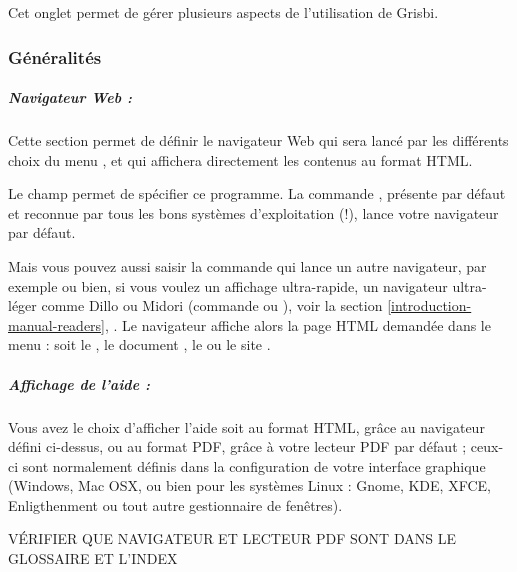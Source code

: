 Cet onglet permet de gérer plusieurs aspects de l'utilisation de Grisbi. 


\subsubsection{Généralités\label{setup-general-various-general}}


\subparagraph{Navigateur Web :\label{setup-general-various-general-browser}}

Cette section permet de définir le navigateur Web qui sera lancé par les différents choix du menu , et qui affichera directement les contenus au format \gls{HTML}. 

Le champ  permet de spécifier ce programme. La commande , présente par défaut et reconnue par tous les bons systèmes d'exploitation (!), lance votre navigateur par défaut.

Mais vous pouvez aussi saisir la commande qui lance un autre navigateur, par exemple  ou bien, si vous voulez un affichage ultra-rapide, un navigateur ultra-léger comme Dillo ou Midori (commande  ou ), voir la section \vref{introduction-manual-readers}, . Le navigateur affiche alors la page HTML demandée dans le menu  : soit le , le document , le  ou le site .


\subparagraph{Affichage de l'aide :\label{setup-general-various-general-display}}

Vous avez le choix d'afficher l'aide soit au format \gls{HTML}, grâce au navigateur défini ci-dessus, ou au format \gls{PDF}, grâce à votre lecteur PDF par défaut ; ceux-ci sont normalement définis dans la configuration de votre interface graphique (Windows, Mac OSX, ou bien pour les systèmes Linux : Gnome, KDE, XFCE, Enligthenment ou tout autre gestionnaire de fenêtres). 


VÉRIFIER QUE NAVIGATEUR ET LECTEUR PDF SONT DANS LE GLOSSAIRE ET L'INDEX



\ifIllustration
\pichskip{7mm}
\label{setup-programs-img}
\fi


